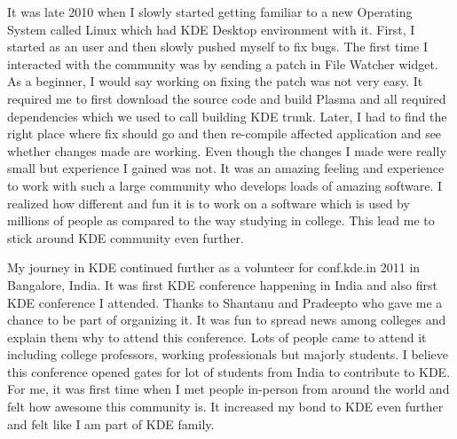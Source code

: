 

\noindent{}It was late 2010 when I slowly started getting familiar to a new Operating System called Linux which had KDE Desktop environment with it. First, I started as an user and then slowly pushed myself to fix bugs. The first time I interacted with the community was by sending a patch in File Watcher widget. As a beginner, I would say working on fixing the patch was not very easy. It required me to first download the source code and build Plasma and all required dependencies which we used to call building KDE trunk. Later, I had to find the right place where fix should go and then re-compile affected application and see whether changes made are working. Even though the changes I made were really small but experience I gained was not. It was an amazing feeling and experience to work with such a large community who develops loads of amazing software. I realized how different and fun it is to work on a software which is used by millions of people as compared to the way studying in college. This lead me to stick around KDE community even further.

My journey in KDE continued further as a volunteer for conf.kde.in 2011 in Bangalore, India. It was first KDE conference happening in India and also first KDE conference I attended. Thanks to Shantanu and Pradeepto who gave me a chance to be part of organizing it. It was fun to spread news among colleges and explain them why to attend this conference. Lots of people came to attend it including college professors, working professionals but majorly students. I believe this conference opened gates for lot of students from India to contribute to KDE. For me, it was first time when I met people in-person from around the world and felt how awesome this community is. It increased my bond to KDE even further and felt like I am part of KDE family.

